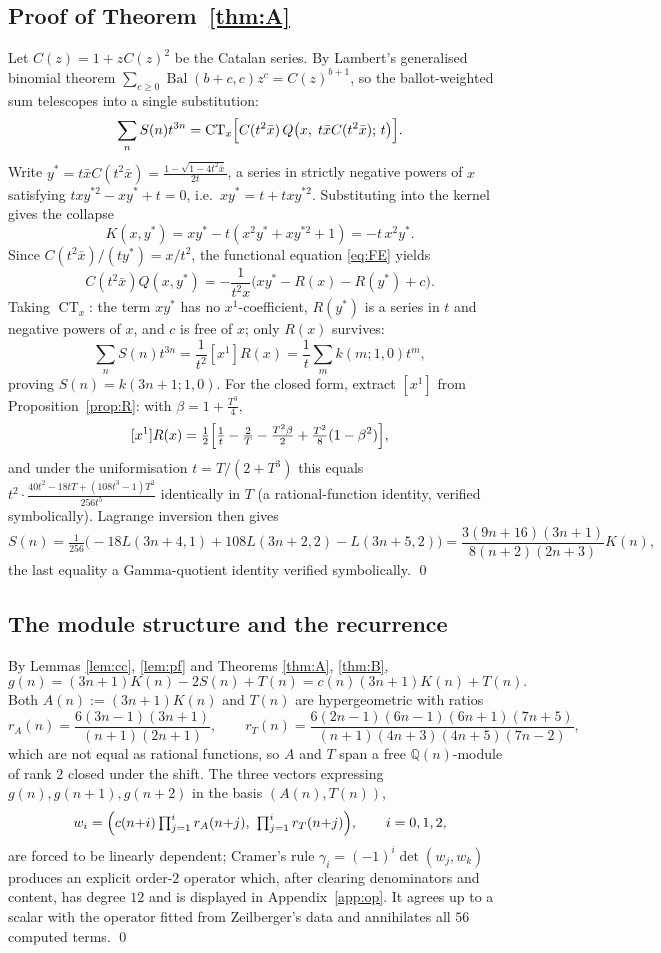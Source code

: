 \documentclass[11pt]{article}
\theoremstyle{definition}
\newcommand{\bx}{\bar x}\newcommand{\by}{\bar y}
\newcommand{\CT}{\operatorname{CT}}
\newcommand{\Bal}{\operatorname{Bal}}
\begin{document}
\subsection{Proof of Theorem~\ref{thm:A}}

Let $C(z)=1+zC(z)^{2}$ be the Catalan series. By Lambert's generalised
binomial theorem $\sum_{c\ge0}\Bal(b+c,c)z^{c}=C(z)^{b+1}$, so the
ballot-weighted sum telescopes into a single substitution:
\[
  \sum_n S(n)t^{3n}
  =\CT_x\Bigl[C(t^{2}\bx)\,Q\bigl(x,\;t\bx C(t^{2}\bx);\,t\bigr)\Bigr].
\]
Write $y^{*}=t\bx C(t^{2}\bx)=\frac{1-\sqrt{1-4t^{2}\bx}}{2t}$, a series in
strictly negative powers of $x$ satisfying $txy^{*2}-xy^{*}+t=0$, i.e.\
$xy^{*}=t+txy^{*2}$. Substituting into the kernel gives the collapse
\[
  K(x,y^{*})=xy^{*}-t(x^{2}y^{*}+xy^{*2}+1)=-t\,x^{2}y^{*}.
\]
Since $C(t^{2}\bx)/(ty^{*})=x/t^{2}$, the functional equation \eqref{eq:FE}
yields
\[
  C(t^{2}\bx)Q(x,y^{*})
  =-\frac{1}{t^{2}x}\bigl(xy^{*}-R(x)-R(y^{*})+c\bigr).
\]
Taking $\CT_x$: the term $xy^{*}$ has no $x^{1}$-coefficient, $R(y^{*})$ is a
series in $t$ and negative powers of $x$, and $c$ is free of $x$; only $R(x)$
survives:
\begin{equation}\label{eq:collapse}
  \sum_n S(n)t^{3n}=\frac{1}{t^{2}}[x^{1}]R(x)
  =\frac1t\sum_m k(m;1,0)t^{m},
\end{equation}
proving $S(n)=k(3n+1;1,0)$. For the closed form, extract $[x^{1}]$ from
Proposition~\ref{prop:R}: with $\beta=1+\tfrac{T^{3}}{4}$,
\[
  [x^{1}]R(x)=\tfrac12\Bigl[\tfrac1t-\tfrac2T-\tfrac{T^{2}\beta}{2}
   +\tfrac{T^{2}}{8}(1-\beta^{2})\Bigr],
\]
and under the uniformisation $t=T/(2+T^{3})$ this equals
$t^{2}\cdot\frac{40t^{2}-18tT+(108t^{3}-1)T^{2}}{256t^{5}}$ identically in $T$
(a rational-function identity, verified symbolically). Lagrange inversion then
gives
\[
  S(n)=\tfrac{1}{256}\bigl(-18L(3n{+}4,1)+108L(3n{+}2,2)-L(3n{+}5,2)\bigr)
  =\frac{3(9n+16)(3n+1)}{8(n+2)(2n+3)}K(n),
\]
the last equality a Gamma-quotient identity verified symbolically. \qed

\subsection{The module structure and the recurrence}

By Lemmas \ref{lem:cc}, \ref{lem:pf} and Theorems \ref{thm:A}, \ref{thm:B},
\[
  g(n)=(3n+1)K(n)-2S(n)+T(n)=c(n)(3n+1)K(n)+T(n).
\]
Both $A(n):=(3n+1)K(n)$ and $T(n)$ are hypergeometric with ratios
\[
  r_A(n)=\frac{6(3n-1)(3n+1)}{(n+1)(2n+1)},\qquad
  r_T(n)=\frac{6(2n-1)(6n-1)(6n+1)(7n+5)}{(n+1)(4n+3)(4n+5)(7n-2)},
\]
which are not equal as rational functions, so $A$ and $T$ span a free
$\mathbb{Q}(n)$-module of rank $2$ closed under the shift. The three vectors
expressing $g(n),g(n+1),g(n+2)$ in the basis $(A(n),T(n))$,
\[
  w_i=\Bigl(c(n{+}i)\textstyle\prod_{j=1}^{i}r_A(n{+}j),\
   \prod_{j=1}^{i}r_T(n{+}j)\Bigr),\qquad i=0,1,2,
\]
are forced to be linearly dependent; Cramer's rule
$\gamma_i=(-1)^{i}\det(w_j,w_k)$ produces an explicit order-$2$ operator which,
after clearing denominators and content, has degree $12$ and is displayed in
Appendix~\ref{app:op}. It agrees up to a scalar with the operator fitted from
Zeilberger's data and annihilates all $56$ computed terms. \qed
\end{document}
